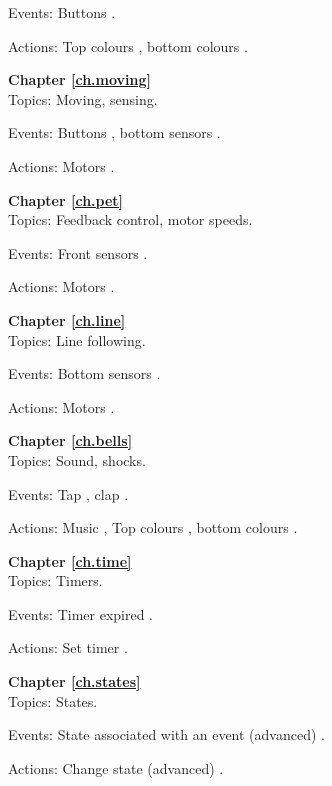 Events: Buttons .

Actions: Top colours ,
bottom colours .

\bigskip
\bigskip

{\centering \textbf{Chapter \ref{ch.moving}}\\}
Topics: Moving, sensing.

Events: Buttons , bottom sensors .

Actions: Motors .

\bigskip
\bigskip

{\centering \textbf{Chapter \ref{ch.pet}}\\}
Topics: Feedback control, motor speeds.

Events: Front sensors .

Actions: Motors .

\bigskip
\bigskip

{\centering \textbf{Chapter \ref{ch.line}}\\}
Topics: Line following.

Events: Bottom sensors .

Actions: Motors .

\bigskip
\bigskip

{\centering \textbf{Chapter \ref{ch.bells}}\\}
Topics: Sound, shocks.

Events: Tap , clap .

Actions: Music ,
Top colours ,
bottom colours .

\bigskip
\bigskip

{\centering \textbf{Chapter \ref{ch.time}}\\}
Topics: Timers.

Events: Timer expired .

Actions: Set timer .

\bigskip
\bigskip

{\centering \textbf{Chapter \ref{ch.states}}\\}
Topics: States.

Events: State associated with an event (advanced)
.

Actions: Change state (advanced) .

